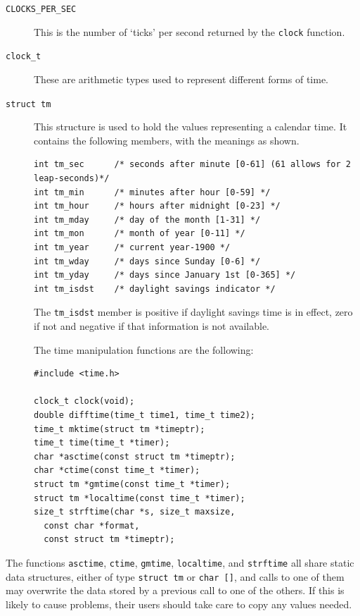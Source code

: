   \begin{description}
   \item[\texttt{CLOCKS\_PER\_SEC}] This is the number of `ticks' per second returned by the
    \texttt{clock} function.

   \item[\texttt{clock\_t}] These are arithmetic types used to represent different forms of
    time.

   \item[\texttt{struct tm}] 
    This structure is used to hold the values representing a calendar time.
     It contains the following members, with the meanings as shown.


    \begin{Verbatim}
int tm_sec      /* seconds after minute [0-61] (61 allows for 2 leap-seconds)*/
int tm_min      /* minutes after hour [0-59] */
int tm_hour     /* hours after midnight [0-23] */
int tm_mday     /* day of the month [1-31] */
int tm_mon      /* month of year [0-11] */
int tm_year     /* current year-1900 */
int tm_wday     /* days since Sunday [0-6] */
int tm_yday     /* days since January 1st [0-365] */
int tm_isdst    /* daylight savings indicator */
\end{Verbatim}

    The \texttt{tm\_isdst} member is positive if daylight savings  time
     is in   effect,  zero  if  not  and  negative  if  that information is not
     available.


    The time manipulation functions are the following:


    \begin{Verbatim}
#include <time.h>

clock_t clock(void);
double difftime(time_t time1, time_t time2);
time_t mktime(struct tm *timeptr);
time_t time(time_t *timer);
char *asctime(const struct tm *timeptr);
char *ctime(const time_t *timer);
struct tm *gmtime(const time_t *timer);
struct tm *localtime(const time_t *timer);
size_t strftime(char *s, size_t maxsize,
  const char *format,
  const struct tm *timeptr);
\end{Verbatim}

   
  \end{description}

  The  functions  \texttt{asctime},  \texttt{ctime},
   \texttt{gmtime},   \texttt{localtime},   and \texttt{strftime}
   all  share  static data structures, either of type \texttt{struct tm} or
   \texttt{char []}, and calls to one of them may overwrite the data
   stored by a previous call to one of the others.  If this is likely to cause
   problems, their  users  should  take care to copy any values needed.


